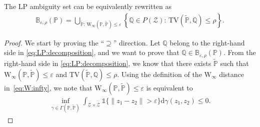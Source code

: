 \documentclass[11pt,a4paper]{article}
\begin{document}
\begin{proposition}
\label{prop:LP:decomposition}
The LP ambiguity set can be equivalently rewritten as 
\begin{align}
\label{eq:LP:decomposition}
    \mathbb{B}_{\varepsilon,\rho}(\mathbb P) = \bigcup_{\widetilde{\mathbb P}:\, \text{W}_\infty(\mathbb P, \widetilde{\mathbb P})\leq \varepsilon} \left\{\mathbb Q\in P(\mathcal{Z}):\, \text{TV}(\widetilde{\mathbb P},\mathbb Q)\leq \rho\right\}.
\end{align}
\end{proposition}
\begin{proof}
We start by proving the ``$\supseteq$'' direction. Let $\mathbb Q$ belong to the right-hand side in \eqref{eq:LP:decomposition}, and we want to prove that $\mathbb Q \in \mathbb{B}_{\varepsilon,\rho}(\mathbb P)$. From the right-hand side in \eqref{eq:LP:decomposition}, we know that there exists $\widetilde{\mathbb P}$ such that $\text{W}_\infty(\mathbb P, \widetilde{\mathbb P})\leq \varepsilon$ and $\text{TV}(\widetilde{\mathbb P}, \mathbb Q)\leq \rho$. Using the definition of the $\text{W}
_\infty$ distance in~\eqref{eq:W:infty}, we note that $\text{W}_\infty(\mathbb P, \widetilde{\mathbb P})\leq \varepsilon$ is equivalent to
\begin{align}
\label{lemma:LP:decomposition:1}
    \inf_{\gamma \in \Gamma(\mathbb P, \widetilde{\mathbb P})} \int_{\mathcal Z \times \mathcal Z} \mathds{1}\{\|z_1 - z_2\| > \varepsilon\} \mathrm{d} \gamma(z_1,z_2) \leq 0.
\end{align}


\end{proof}
\end{document}
